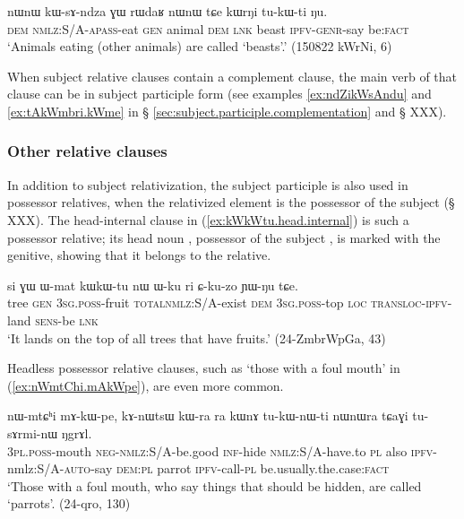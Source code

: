 \begin{exe}
\ex \label{ex:kWsAndza.GW}
 \gll nɯnɯ kɯ-sɤ-ndza ɣɯ rɯdaʁ nɯnɯ tɕe kɯrŋi tu-kɯ-ti ŋu.  \\
 \textsc{dem} \textsc{nmlz}:S/A-\textsc{apass}-eat \textsc{gen} animal \textsc{dem} \textsc{lnk} beast \textsc{ipfv}-\textsc{genr}-say be:\textsc{fact} \\
 \glt `Animals eating (other animals) are called `beasts'.' (150822 kWrNi, 6)
\end{exe}


When subject relative clauses contain a complement clause, the main verb of that clause can be in subject participle form (see examples \ref{ex:ndZikWsAndu} and \ref{ex:tAkWmbri.kWme} in § \ref{sec:subject.participle.complementation} and § XXX).
 
\subsubsection{Other relative clauses}  \label{sec:subject.participle.other.relative}
In addition to subject relativization, the subject participle is also used in possessor relatives, when the relativized element is the possessor of the subject (§ XXX).  The head-internal clause in (\ref{ex:kWkWtu.head.internal}) is such a possessor relative; its head noun , possessor of the subject ,  is marked with the genitive, showing that it belongs to the relative.  

\begin{exe}
\ex \label{ex:kWkWtu.head.internal}
 \gll si ɣɯ ɯ-mat kɯ\redp{}kɯ-tu nɯ ɯ-ku ri ɕ-ku-zo ɲɯ-ŋu tɕe. \\
 tree \textsc{gen} \textsc{3sg}.\textsc{poss}-fruit \textsc{total}\redp{}\textsc{nmlz}:S/A-exist \textsc{dem} \textsc{3sg}.\textsc{poss}-top \textsc{loc} \textsc{transloc}-\textsc{ipfv}-land \textsc{sens}-be \textsc{lnk} \\
 \glt `It lands on the top of all trees that have fruits.' (24-ZmbrWpGa, 43)
\end{exe}

 Headless possessor relative clauses, such as   `those with a foul mouth' in (\ref{ex:nWmtChi.mAkWpe}), are even more common.

\begin{exe}
\ex \label{ex:nWmtChi.mAkWpe}
 \gll nɯ-mtɕʰi mɤ-kɯ-pe, kɤ-nɯtsɯ kɯ-ra ra kɯnɤ tu-kɯ-nɯ-ti nɯnɯra tɕaɣi tu-sɤrmi-nɯ ŋgrɤl. \\
 \textsc{3pl}.\textsc{poss}-mouth \textsc{neg}-\textsc{nmlz}:S/A-be.good \textsc{inf}-hide \textsc{nmlz}:S/A-have.to \textsc{pl} also \textsc{ipfv}-nmlz:S/A-\textsc{auto}-say \textsc{dem}:\textsc{pl} parrot \textsc{ipfv}-call-\textsc{pl} be.usually.the.case:\textsc{fact} \\
 \glt `Those with a foul mouth, who say things that should be hidden, are called `parrots'. (24-qro, 130)
\end{exe}

